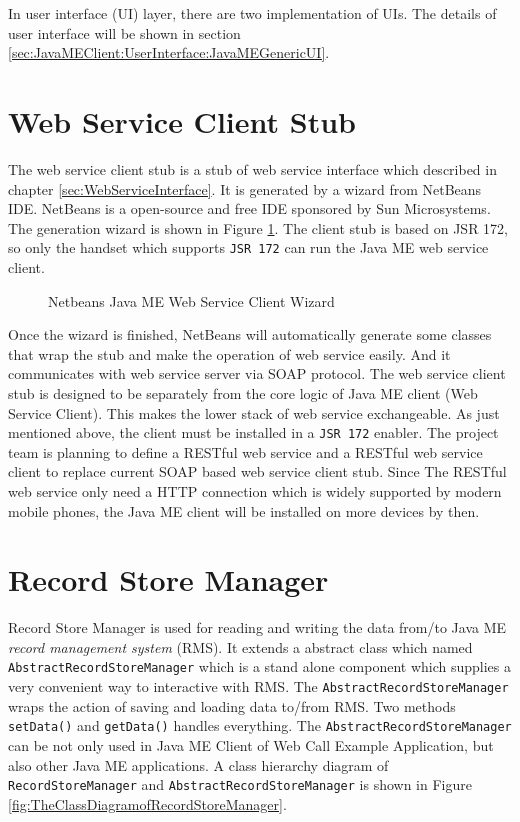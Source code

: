 In user interface (UI) layer, there are two implementation of UIs. The details of user interface will be shown in section \ref{sec:JavaMEClient:UserInterface:JavaMEGenericUI}. 

\section{Web Service Client Stub}
\label{sec:JavaMEClient:WebServiceClientStub}

The web service client stub is a stub of web service interface which described in chapter \nolinebreak \ref{sec:WebServiceInterface}. It is generated by a wizard from NetBeans IDE. NetBeans is a open-source and free IDE sponsored by Sun Microsystems. The generation wizard is shown in Figure \ref{fig:NetbeansJavaMEWebServiceClientWizard}. The client stub is based on JSR 172, so only the handset which supports \texttt{JSR 172} can run the Java ME web service client.

\begin{figure}[!hbtp]
\centering
{}
\caption{Netbeans Java ME Web Service Client Wizard}
\label{fig:NetbeansJavaMEWebServiceClientWizard}
\end{figure}

Once the wizard is finished, NetBeans will automatically generate some classes that wrap the stub and make the operation of web service easily. And it communicates with web service server via SOAP protocol. The web service client stub is designed to be separately from the core logic of Java ME client (Web Service Client). This makes the lower stack of web service exchangeable. As just mentioned above, the client must be installed in a \texttt{JSR 172} enabler. The project team is planning to define a RESTful web service and a RESTful web service client to replace current SOAP based web service client stub. Since The RESTful web service only need a HTTP connection which is widely supported by modern mobile phones, the Java ME client will be installed on more devices by then. 


\section{Record Store Manager}
\label{sec:JavaMEClient:RecordStoreManager}

Record Store Manager is used for reading and writing the data from/to Java ME \textit{record management system} (RMS). It extends a abstract class which named \texttt{AbstractRecordStoreManager} which is a stand alone component which supplies a very convenient way to interactive with RMS. The \texttt{AbstractRecordStoreManager} wraps the action of saving and loading data to/from RMS. Two methods \texttt{setData()} and \texttt{getData()} handles everything. The \texttt{AbstractRecordStoreManager} can be not only used in Java ME Client of Web Call Example Application, but also other Java ME applications. A class hierarchy diagram of \texttt{RecordStoreManager} and \texttt{AbstractRecordStoreManager} is shown in Figure \ref{fig:TheClassDiagramofRecordStoreManager}.

